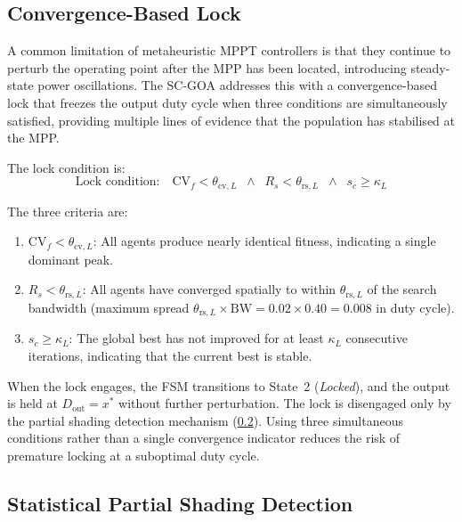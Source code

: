 \documentclass[a4paper, 12pt]{article}
\begin{document}
\subsection{Convergence-Based Lock}
\label{subsec:convergence_lock}

A common limitation of metaheuristic MPPT controllers is that they continue to perturb the operating point after the MPP has been located, introducing steady-state power oscillations. The SC-GOA addresses this with a convergence-based lock that freezes the output duty cycle when three conditions are simultaneously satisfied, providing multiple lines of evidence that the population has stabilised at the MPP.

The lock condition is:
\begin{equation}
    \text{Lock condition:} \quad
    \mathrm{CV}_f < \theta_{\mathrm{cv},L} \;\;\wedge\;\; R_s < \theta_{\mathrm{rs},L} \;\;\wedge\;\; s_c \geq \kappa_L
    \label{eq:lock_condition}
\end{equation}

The three criteria are:
\begin{enumerate}[label=(\alph*)]
    \item $\mathrm{CV}_f < \theta_{\mathrm{cv},L}$: All agents produce nearly identical fitness, indicating a single dominant peak.
    \item $R_s < \theta_{\mathrm{rs},L}$: All agents have converged spatially to within $\theta_{\mathrm{rs},L}$ of the search bandwidth (maximum spread $\theta_{\mathrm{rs},L} \times \mathrm{BW} = 0.02 \times 0.40 = 0.008$ in duty cycle).
    \item $s_c \geq \kappa_L$: The global best has not improved for at least $\kappa_L$ consecutive iterations, indicating that the current best is stable.
\end{enumerate}

When the lock engages, the FSM transitions to State~2 (\textit{Locked}), and the output is held at $D_{\text{out}} = x^{*}$ without further perturbation. The lock is disengaged only by the partial shading detection mechanism (\cref{subsec:ps_detection}). Using three simultaneous conditions rather than a single convergence indicator reduces the risk of premature locking at a suboptimal duty cycle.


\subsection{Statistical Partial Shading Detection}
\label{subsec:ps_detection}
\end{document}
